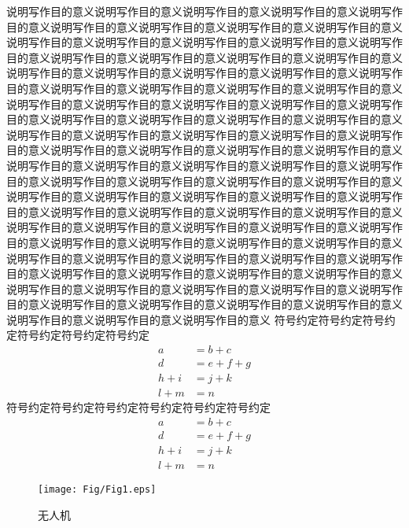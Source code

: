 说明写作目的意义说明写作目的意义说\cite{RN18}明写作目的意义说明写作目的意义说明写作目的意义说明写作目的意义说明写作目的意义说明写作目的意义说明写作目的意义说明写作目的意义说明写作目的意义说明写作目的意义说明写作目的意义说明写作目的意义说明写作目的意义说明写作目的意义说明写作目的意义说明写作目的意义说明写作目的意义说明写作目的意义说明写作目的意义说明写作目的意义说明写作目的意义说明写作目的意义说明写作目的意义说明写作目的意义说明写作目的意义说明写作目的\cite{LiFeiXianXingDuoZhiNengTiXiTongJiaoDuGangXingBianDuiKongZhi2022}意义说明写作目的意义说明写作目的意义说明写作目的意义说明写作目的意义说明写作目的意义说明写作目的意义说明写作目的意义说明写作目的意义说明写作目的意义说明写作目的意义说明写作目的意义说明写作目的意义说明写作目的意义说明写作目的意义说明写作目的意义说明写作目的意义说明写作目的意义说明写作目的意义说明写作目的意义说明写作目的意义说明写作目的意义说明写作目的意义说明写作目的意义说明写作目的意义说明写作目的意义说明写作目的意义说明写作目的意义说明写作目的意义说明写作目的意义说明写作目的意义说明写作目的意义说明写作目的意义说明写作目的意义说明写作目的意义说明写作目的意义说明写作目的意义说明写作目的意义说明写作目的意义说明写作目的意义说明写作目的意义说明写作目的意义说明写作目的意义说明写作目的意义说明写作目的意义说明写作目的意义说明写作目的意义说明写作目的意义说明写作目的意义说明写作目的意义说明写作目的意义说明写作目的意义说明写作目的意义说明写作目的意义说明写作目的意义说明写作目的意义说明写作目的意义说明写作目的意义说明写作目的意义说明写作目的意义说明写作目的意义说明写作目的意义说明写作目的意义说明写作目的意义说明写作目的意义说明写作目的意义\parencite{RN22}
符号约定符号约定符号约定符号约定符号约定符号约定
\begin{equation}
	\begin{aligned}
		a &= b + c \\
		d &= e + f + g \\
		h + i &= j + k \\
		l + m &= n
	\end{aligned}
\end{equation}
符号约定符号约定符号约定符号约定符号约定符号约定
\begin{equation}
	\begin{aligned}
		a &= b + c \\
		d &= e + f + g \\
		h + i &= j + k \\
		l + m &= n
	\end{aligned}
\end{equation}
\begin{figure}[!h]
	\centering
	\texttt{[image: Fig/Fig1.eps]}
	\caption{无人机}
	\label{fig:1}     
\end{figure}
